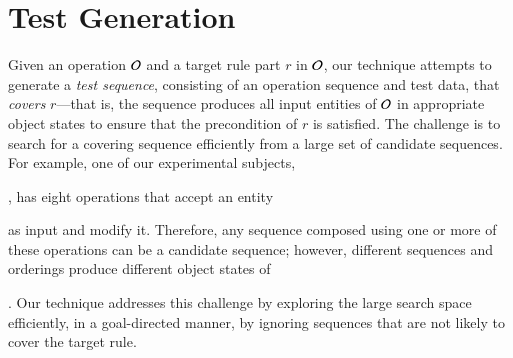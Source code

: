\section{Test Generation}
\label{sec:approach}

Given an operation ${\cal O}$ and a target rule part $r$ in ${\cal O}$, our
technique attempts to generate a \textit{test sequence}, consisting of an
operation sequence and test data, that \textit{covers} $r$---that is, the
sequence produces all input entities of ${\cal O}$ in appropriate object states
to ensure that the precondition of $r$ is satisfied. The challenge is to search
for a covering sequence efficiently from a large set of candidate sequences. For
example, one of our experimental subjects, \subject{Cebu-pacific}, has eight
operations that accept an entity \subject{Ticket} as input and modify
it. Therefore, any sequence composed using one or more of these operations can
be a candidate sequence; however, different sequences and orderings produce
different object states of \subject{Ticket}. Our technique addresses this
challenge by exploring the large search space efficiently, in a goal-directed
manner, by ignoring sequences that are not likely to cover the target rule.



